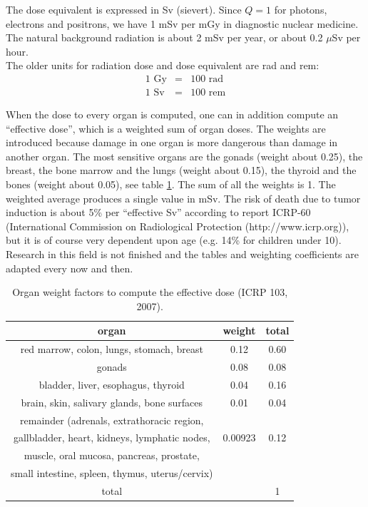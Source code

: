 The dose equivalent is expressed in Sv (sievert). Since $Q = 1$ for photons,
electrons and positrons, we have 1 mSv per mGy in diagnostic nuclear
medicine. The natural background radiation is about 2 mSv per year, or
about 0.2 $\mu$Sv per hour.\\

The older units for radiation dose and dose equivalent are rad and rem:
\begin{eqnarray}
  \mbox{1 Gy} & = & \mbox{100 rad}\\
  \mbox{1 Sv} & = & \mbox{100 rem}
\end{eqnarray}

When the dose to every organ is computed, one can in addition compute
an ``effective dose'', which is a weighted sum of organ doses. The
weights are introduced because damage in one organ is more dangerous
than damage in another organ. The most sensitive organs are the gonads
(weight about 0.25), the breast, the bone marrow and the lungs (weight
about 0.15), the thyroid and the bones (weight about 0.05), see table
\ref{tab:effdose}. The sum of all the weights is 1. The weighted
average produces a single value in mSv. The risk of death due to tumor
induction is about 5\% per ``effective Sv'' according to report
ICRP-60 (International Commission on Radiological Protection
(http://www.icrp.org)), but it is of course very dependent upon age
(e.g. 14\% for children under 10). Research in this field is not
finished and the tables and weighting coefficients are adapted every
now and then.

\begin{table}[h]
\begin{center}
\caption{Organ weight factors to compute the effective dose (ICRP 103, 2007).
\label{tab:effdose}}
\begin{tabular}{|c|c|c|}
  \hline
  organ & weight & total\\
  \hline
  red marrow, colon, lungs, stomach, breast & 0.12 & 0.60\\
  \hline
  gonads & 0.08 & 0.08\\
  \hline
  bladder, liver, esophagus, thyroid & 0.04 & 0.16\\
  \hline
  brain, skin, salivary glands, bone surfaces & 0.01 & 0.04\\
  \hline
  remainder (adrenals, extrathoracic region, & & \\
  gallbladder, heart, kidneys, lymphatic nodes, & 0.00923& 0.12\\
  muscle, oral mucosa, pancreas, prostate, & & \\
  small intestine, spleen, thymus, uterus/cervix) & &\\
  \hline
  total  & & 1 \\
  \hline
\end{tabular}
\end{center}
\end{table}


